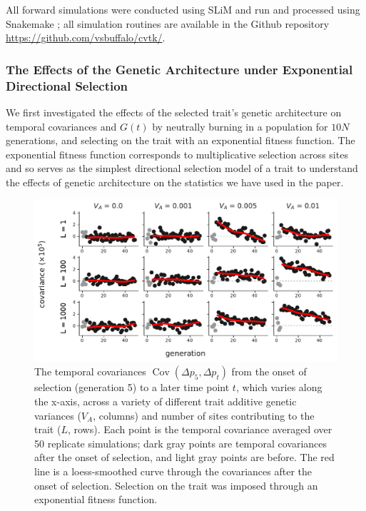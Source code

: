 \documentclass[11pt]{article}
\DeclareMathOperator{\cov}{Cov}
\begin{document}
{All forward simulations were conducted using SLiM \parencite{Haller2019-vu} and
run and processed using Snakemake \parencite{Koster2012-iv}; all simulation
routines are available in the Github repository
\url{https://github.com/vsbuffalo/cvtk/}.

\subsubsection{The Effects of the Genetic Architecture under Exponential Directional Selection}
\label{supp:genetic-arch}

We first investigated the effects of the selected trait's genetic architecture
on temporal covariances and $G(t)$ by neutrally burning in a population for
$10N$ generations, and selecting on the trait with an exponential fitness
function. The exponential fitness function corresponds to multiplicative
selection across sites and so serves as the simplest directional selection
model of a trait to understand the effects of genetic architecture on the
statistics we have used in the paper.

\begin{figure}[!ht]
  \centering
  \includegraphics[width=\textwidth]{figures/fig-architecture-cov.pdf}

  \caption{The temporal covariances $\cov(\Delta p_5, \Delta p_t)$ from the
    onset of selection (generation 5) to a later time point $t$, which varies
    along the x-axis, across a variety of different trait additive genetic
    variances ($V_A$, columns) and number of sites contributing to the trait
    ($L$, rows). Each point is the temporal covariance averaged over 50
    replicate simulations; dark gray points are temporal covariances after the
    onset of selection, and light gray points are before. The red line is a
    loess-smoothed curve through the covariances after the onset of selection.
    Selection on the trait was imposed through an exponential fitness function.}


\end{figure}}
\end{document}
